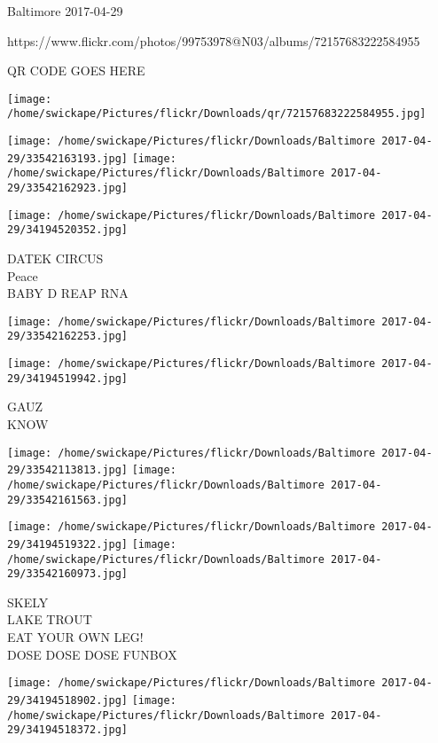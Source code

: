 \documentclass[10pt,letterpaper]{article}
\begin{document}
Baltimore 2017-04-29

https://www.flickr.com/photos/99753978@N03/albums/72157683222584955

QR CODE GOES HERE

\texttt{[image: /home/swickape/Pictures/flickr/Downloads/qr/72157683222584955.jpg]}
\pagebreak

\texttt{[image: /home/swickape/Pictures/flickr/Downloads/Baltimore 2017-04-29/33542163193.jpg]}
\texttt{[image: /home/swickape/Pictures/flickr/Downloads/Baltimore 2017-04-29/33542162923.jpg]}

\texttt{[image: /home/swickape/Pictures/flickr/Downloads/Baltimore 2017-04-29/34194520352.jpg]}

DATEK CIRCUS\\
Peace\\
BABY D REAP RNA\\
\pagebreak

\texttt{[image: /home/swickape/Pictures/flickr/Downloads/Baltimore 2017-04-29/33542162253.jpg]}

\vspace{0.25in}
\texttt{[image: /home/swickape/Pictures/flickr/Downloads/Baltimore 2017-04-29/34194519942.jpg]}

GAUZ\\
KNOW\\
\pagebreak

\texttt{[image: /home/swickape/Pictures/flickr/Downloads/Baltimore 2017-04-29/33542113813.jpg]}
\texttt{[image: /home/swickape/Pictures/flickr/Downloads/Baltimore 2017-04-29/33542161563.jpg]}

\texttt{[image: /home/swickape/Pictures/flickr/Downloads/Baltimore 2017-04-29/34194519322.jpg]}
\texttt{[image: /home/swickape/Pictures/flickr/Downloads/Baltimore 2017-04-29/33542160973.jpg]}

SKELY\\
LAKE TROUT\\
EAT YOUR OWN LEG!\\
DOSE DOSE DOSE FUNBOX\\
\pagebreak

\texttt{[image: /home/swickape/Pictures/flickr/Downloads/Baltimore 2017-04-29/34194518902.jpg]}
\texttt{[image: /home/swickape/Pictures/flickr/Downloads/Baltimore 2017-04-29/34194518372.jpg]}
\end{document}
